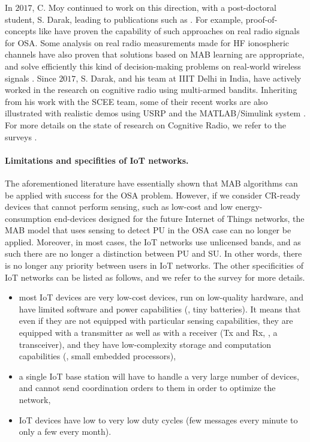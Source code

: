 In $2017$, C. Moy continued to work on this direction, with a post-doctoral student, S. Darak, leading to publications such as
\cite{darak2016bayesian,Darak16}.
%
For example, proof-of-concepts like \cite{kumar2016two} have proven the capability of such approaches on real radio signals for OSA.
%
Some analysis on real radio measurements made for HF ionospheric channels have also proven that solutions based on MAB learning are appropriate, and solve efficiently this kind of decision-making problems on real-world wireless signals \cite{Melian15}.
%
Since $2017$, S. Darak, and his team at IIIT Delhi in India, have actively worked in the research on cognitive radio using multi-armed bandits.
Inheriting from his work with the SCEE team,
some of their recent works are also illustrated with realistic demos using USRP and the MATLAB/Simulink system
\cite{KumarYadav2018,SawantKumar2018,JoshiKumar2018}.
%
For more details on the state of research on Cognitive Radio, we refer to the surveys \cite{garhwal2012survey,marinho2012cognitive}.



\paragraph{Limitations and specifities of IoT networks.}
%
The aforementioned literature have essentially shown that MAB algorithms can be applied with success for the OSA problem.
However, if we consider CR-ready devices that cannot perform sensing, such as low-cost and low energy-consumption end-devices designed for the future Internet of Things networks, the MAB model that uses sensing to detect PU in the OSA case can no longer be applied.
Moreover, in most cases, the IoT networks use unlicensed bands, and as such there are no longer a distinction between PU and SU.
In other words, there is no longer any priority between users in IoT networks.
%
The other specificities of IoT networks can be listed as follows,
and we refer to the survey \cite{Centenaro16} for more details.
\begin{itemize}\tightlist
    \item
    most IoT devices are very low-cost devices, run on low-quality hardware, and have limited software and power capabilities (\ie, tiny batteries).
    It means that even if they are not equipped with particular sensing capabilities,
    they are equipped with a transmitter as well as with a receiver (Tx and Rx, \ie, a transceiver),
    and they have low-complexity storage and computation capabilities (\ie, small embedded processors),
    \item
    a single IoT base station will have to handle a very large number of devices,
    and cannot send coordination orders to them in order to optimize the network,
    \item
    IoT devices have low to very low duty cycles (few messages every minute to only a few every month).
\end{itemize}


